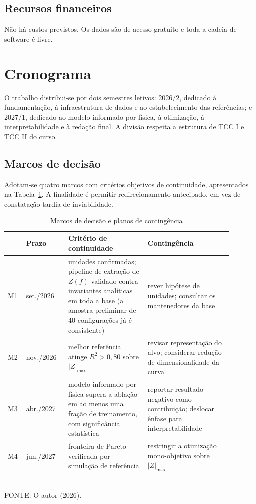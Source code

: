 \subsection{Recursos financeiros}

Não há custos previstos. Os dados são de acesso gratuito e toda a cadeia de
software é livre.

\section{Cronograma}
\label{sec:cronograma}

O trabalho distribui-se por dois semestres letivos: 2026/2, dedicado à
fundamentação, à infraestrutura de dados e ao estabelecimento das referências; e
2027/1, dedicado ao modelo informado por física, à otimização, à
interpretabilidade e à redação final. A divisão respeita a estrutura de TCC I e
TCC II do curso.

\subsection{Marcos de decisão}

Adotam-se quatro marcos com critérios objetivos de continuidade, apresentados na
Tabela~\ref{tab:marcos}. A finalidade é permitir redirecionamento antecipado, em
vez de constatação tardia de inviabilidade.

\begin{table}[htb]
\centering
\caption{Marcos de decisão e planos de contingência}
\label{tab:marcos}
\footnotesize
\begin{tabular}{@{}p{0.06\linewidth}p{0.17\linewidth}p{0.32\linewidth}p{0.34\linewidth}@{}}
\toprule
& \textbf{Prazo} & \textbf{Critério de continuidade} & \textbf{Contingência} \\
\midrule
M1 & set./2026 & unidades confirmadas; pipeline de extração de $Z(f)$ validado
contra invariantes analíticas em toda a base (a amostra preliminar de 40
configurações já é consistente) & rever hipótese de unidades; consultar os
mantenedores da base \\[0.4em]
M2 & nov./2026 & melhor referência atinge $R^2 > 0{,}80$ sobre $|Z|_{\max}$ &
revisar representação do alvo; considerar redução de dimensionalidade da curva
\\[0.4em]
M3 & abr./2027 & modelo informado por física supera a ablação em ao menos uma
fração de treinamento, com significância estatística & reportar resultado
negativo como contribuição; deslocar ênfase para interpretabilidade \\[0.4em]
M4 & jun./2027 & fronteira de Pareto verificada por simulação de referência &
restringir a otimização mono-objetivo sobre $|Z|_{\max}$ \\
\bottomrule
\end{tabular}
\vspace{0.3em}
\\{\footnotesize FONTE: O autor (2026).}
\end{table}

